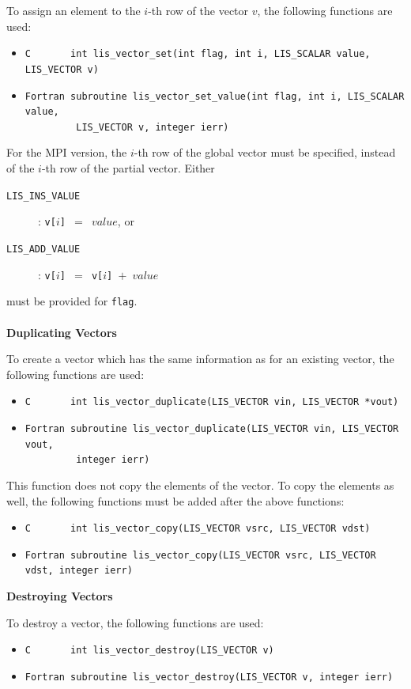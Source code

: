 \documentclass[a4paper]{article}
\begin{document}
To assign an element to the $i$-th row of the vector $v$, the following functions are used:
\begin{itemize}
\item \verb|C       int lis_vector_set(int flag, int i, LIS_SCALAR value, LIS_VECTOR v)|
\item \verb|Fortran subroutine lis_vector_set_value(int flag, int i, LIS_SCALAR value,|\\
      \verb|         LIS_VECTOR v, integer ierr)|
\end{itemize}
For the MPI version, the $i$-th row of the global vector must be
specified, instead of the $i$-th row of the partial vector. 
Either
\begin{description}
\item[\tt LIS\_INS\_VALUE]: {\tt v[$i$] $=$ $value$}, or
\item[\tt LIS\_ADD\_VALUE]: {\tt v[$i$] $=$ v[$i$] $+$ $value$}
\end{description}
must be provided for \verb+flag+.
\\ \\
\noindent
{\bf Duplicating Vectors}

To create a vector which has the same information as for an existing vector, 
the following functions are used:
\begin{itemize}
\item \verb|C       int lis_vector_duplicate(LIS_VECTOR vin, LIS_VECTOR *vout)|
\item \verb|Fortran subroutine lis_vector_duplicate(LIS_VECTOR vin, LIS_VECTOR vout,|\\
      \verb|         integer ierr)|
\end{itemize}
This function does not copy the elements of the vector. 
To copy the elements as well, the following functions must be added after the above functions:
\begin{itemize}
\item \verb|C       int lis_vector_copy(LIS_VECTOR vsrc, LIS_VECTOR vdst)|
\item \verb|Fortran subroutine lis_vector_copy(LIS_VECTOR vsrc, LIS_VECTOR vdst, integer ierr)|
\end{itemize}
\noindent
{\bf Destroying Vectors}

To destroy a vector, the following functions are used:
\begin{itemize}
\item \verb|C       int lis_vector_destroy(LIS_VECTOR v)|
\item \verb|Fortran subroutine lis_vector_destroy(LIS_VECTOR v, integer ierr)|
\end{itemize}
\end{document}
